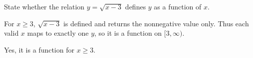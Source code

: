 \documentclass[a4paper,11pt]{article}
\begin{document}
\maketitle

\begin{problem}
State whether the relation $y = \sqrt{x-3}$ defines $y$ as a function of $x$.
\end{problem}

\begin{solution}
For $x \ge 3$, $\sqrt{x-3}$ is defined and returns the nonnegative value only.
Thus each valid $x$ maps to exactly one $y$, so it is a function on $[3,\infty)$.
\end{solution}

\begin{answer}
Yes, it is a function for $x \ge 3$.
\finalanswer{Function on $[3,\infty)$}
\end{answer}
\end{document}
